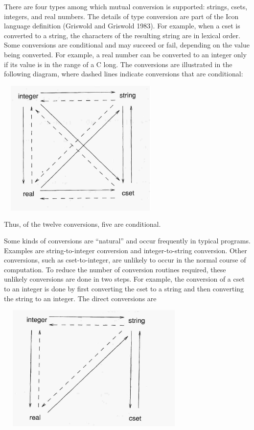 There are four types among which mutual conversion is supported:
strings, csets, integers, and real numbers. The details of type
conversion are part of the Icon language definition (Griswold and
Griswold 1983). For example, when a cset is converted to a string, the
characters of the resulting string are in lexical order. Some
conversions are conditional and may succeed or fail, depending on the
value being converted. For example, a real number can be converted to
an integer only if its value is in the range of a C long. The
conversions are illustrated in the following diagram, where dashed
lines indicate conversions that are conditional:


\ \  \includegraphics[width=2.9925in,height=2.6575in]{ib-img/ib-img105.jpg} 


Thus, of the twelve conversions, five are conditional.

Some kinds of conversions are ``natural'' and occur frequently in
typical programs. Examples are string-to-integer conversion and
integer-to-string conversion. Other conversions, such as
cset-to-integer, are unlikely to occur in the normal course of
computation. To reduce the number of conversion routines required,
these unlikely conversions are done in two steps. For example, the
conversion of a cset to an integer is done by first converting the
cset to a string and then converting the string to an integer. The
direct conversions are

\ \  \includegraphics[width=3.5272in,height=2.4717in]{ib-img/ib-img106.jpg} 

